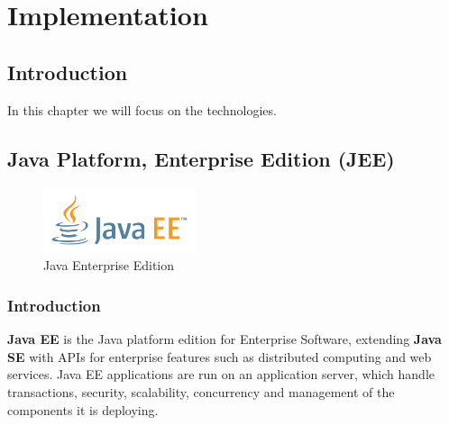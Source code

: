 
	
\chapter{Implementation}

	\section{Introduction}
	
	In this chapter we will focus on the technologies. 
	\clearpage
	\newpage
	\section{Java Platform, Enterprise Edition (JEE)}
		\begin{figure}[h]
		\centering
		\includegraphics[width=0.4\textwidth]{JAVAEE_logo.png}
		\caption{Java Enterprise Edition}
		
	    \end{figure}

\subsection{Introduction}
\textbf{Java EE} is the Java platform edition for Enterprise Software, extending \textbf{Java SE} with APIs for enterprise features such as distributed computing and web services. Java EE applications are run on an application server, which handle transactions, security, scalability, concurrency and management of the components it is deploying.
\\
\\

